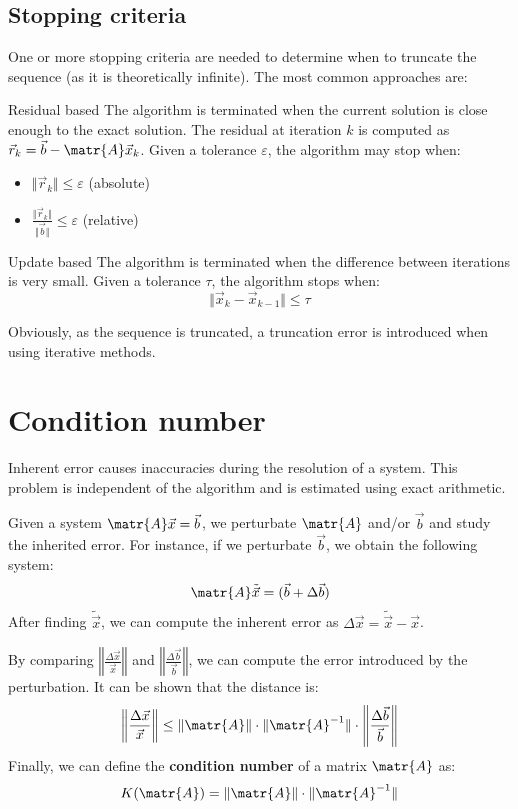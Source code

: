 \subsection{Stopping criteria}
One or more stopping criteria are needed to determine when to truncate the sequence (as it is theoretically infinite).
The most common approaches are:
\begin{descriptionlist}
    \item[Residual based]
        The algorithm is terminated when the current solution is close enough to the exact solution.
        The residual at iteration $k$ is computed as $\vec{r}_k = \vec{b} - \matr{A}\vec{x}_k$.
        Given a tolerance $\varepsilon$, the algorithm may stop when:
        \begin{itemize}
            \item $\Vert \vec{r}_k \Vert \leq \varepsilon$ (absolute)
            \item $\frac{\Vert \vec{r}_k \Vert}{\Vert \vec{b} \Vert} \leq \varepsilon$ (relative)
        \end{itemize}

    \item[Update based] 
        The algorithm is terminated when the difference between iterations is very small.
        Given a tolerance $\tau$, the algorithm stops when:
        \[ \Vert \vec{x}_{k} - \vec{x}_{k-1} \Vert \leq \tau \]
\end{descriptionlist}
Obviously, as the sequence is truncated, a truncation error is introduced when using iterative methods.



\section{Condition number}
Inherent error causes inaccuracies during the resolution of a system.
This problem is independent of the algorithm and is estimated using exact arithmetic.

Given a system $\matr{A}\vec{x} = \vec{b}$, we perturbate $\matr{A}$ and/or $\vec{b}$ and study the inherited error.
For instance, if we perturbate $\vec{b}$, we obtain the following system:
\[ \matr{A}\tilde{\vec{x}} = (\vec{b} + \Delta\vec{b}) \]
After finding $\tilde{\vec{x}}$, we can compute the inherent error as $\Delta\vec{x} = \tilde{\vec{x}} - \vec{x}$.

By comparing $\left\Vert \frac{\Delta\vec{x}}{\vec{x}} \right\Vert$ and $\left\Vert \frac{\Delta\vec{b}}{\vec{b}} \right\Vert$, 
we can compute the error introduced by the perturbation.
It can be shown that the distance is:
\[ 
    \left\Vert \frac{\Delta\vec{x}}{\vec{x}} \right\Vert \leq 
    \Vert \matr{A} \Vert \cdot \Vert \matr{A}^{-1} \Vert \cdot \left\Vert \frac{\Delta\vec{b}}{\vec{b}} \right\Vert 
\]
Finally, we can define the \textbf{condition number} of a matrix $\matr{A}$ as: 
\[ K(\matr{A}) = \Vert \matr{A} \Vert \cdot \Vert \matr{A}^{-1} \Vert \]

